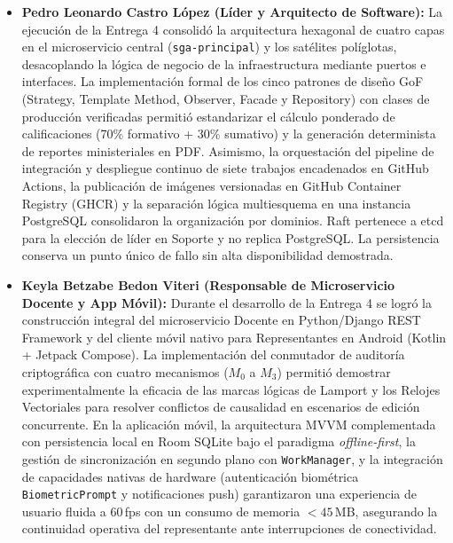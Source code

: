 \documentclass[11pt,a4paper]{article}
\begin{document}
\begin{itemize}[leftmargin=*]
  \item \textbf{Pedro Leonardo Castro L\'opez (L\'ider y Arquitecto de Software):} La ejecuci\'on de la Entrega 4 consolid\'o la arquitectura hexagonal de cuatro capas en el microservicio central (\texttt{sga-principal}) y los sat\'elites pol\'iglotas, desacoplando la l\'ogica de negocio de la infraestructura mediante puertos e interfaces. La implementaci\'on formal de los cinco patrones de dise\~no GoF (Strategy, Template Method, Observer, Facade y Repository) con clases de producci\'on verificadas permiti\'o estandarizar el c\'alculo ponderado de calificaciones (70\% formativo + 30\% sumativo) y la generaci\'on determinista de reportes ministeriales en PDF. Asimismo, la orquestaci\'on del pipeline de integraci\'on y despliegue continuo de siete trabajos encadenados en GitHub Actions, la publicaci\'on de im\'agenes versionadas en GitHub Container Registry (GHCR) y la separaci\'on l\'ogica multiesquema en una instancia PostgreSQL consolidaron la organizaci\'on por dominios. Raft pertenece a etcd para la elecci\'on de l\'ider en Soporte y no replica PostgreSQL. La persistencia conserva un punto \'unico de fallo sin alta disponibilidad demostrada.

  \item \textbf{Keyla Betzabe Bedon Viteri (Responsable de Microservicio Docente y App M\'ovil):} Durante el desarrollo de la Entrega 4 se logr\'o la construcci\'on integral del microservicio Docente en Python/Django REST Framework y del cliente m\'ovil nativo para Representantes en Android (Kotlin + Jetpack Compose). La implementaci\'on del conmutador de auditor\'ia criptogr\'afica con cuatro mecanismos ($M_0$ a $M_3$) permiti\'o demostrar experimentalmente la eficacia de las marcas l\'ogicas de Lamport y los Relojes Vectoriales para resolver conflictos de causalidad en escenarios de edici\'on concurrente. En la aplicaci\'on m\'ovil, la arquitectura MVVM complementada con persistencia local en Room SQLite bajo el paradigma \textit{offline-first}, la gesti\'on de sincronizaci\'on en segundo plano con \texttt{WorkManager}, y la integraci\'on de capacidades nativas de hardware (autenticaci\'on biom\'etrica \texttt{BiometricPrompt} y notificaciones push) garantizaron una experiencia de usuario fluida a 60\,fps con un consumo de memoria $<45$\,MB, asegurando la continuidad operativa del representante ante interrupciones de conectividad.


\end{itemize}
\end{document}
